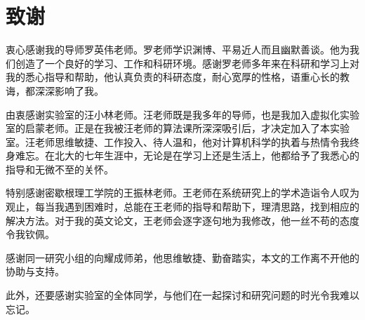 
\chapter{致谢}

衷心感谢我的导师罗英伟老师。罗老师学识渊博、平易近人而且幽默善谈。他为我们创造了一个良好的学习、工作和科研环境。感谢罗老师多年来在科研和学习上对我的悉心指导和帮助，他认真负责的科研态度，耐心宽厚的性格，语重心长的教诲，都深深影响了我。

由衷感谢实验室的汪小林老师。汪老师既是我多年的导师，也是我加入虚拟化实验室的启蒙老师。正是在我被汪老师的算法课所深深吸引后，才决定加入了本实验室。汪老师思维敏捷、工作投入、待人温和，他对计算机科学的执着与热情令我终身难忘。在北大的七年生涯中，无论是在学习上还是生活上，他都给予了我悉心的指导和无微不至的关怀。

特别感谢密歇根理工学院的王振林老师。王老师在系统研究上的学术造诣令人叹为观止，每当我遇到困难时，总能在王老师的指导和帮助下，理清思路，找到相应的解决方法。对于我的英文论文，王老师会逐字逐句地为我修改，他一丝不苟的态度令我钦佩。

感谢同一研究小组的向耀成师弟，他思维敏捷、勤奋踏实，本文的工作离不开他的协助与支持。

此外，还要感谢实验室的全体同学，与他们在一起探讨和研究问题的时光令我难以忘记。



